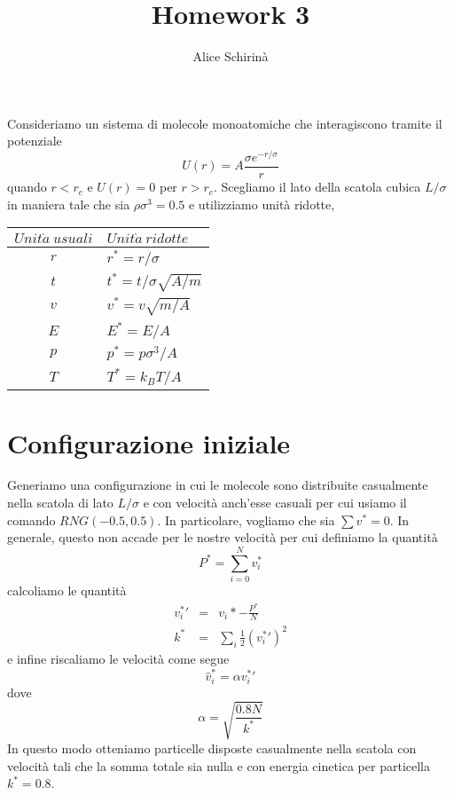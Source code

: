 \documentclass[a4paper,11pt]{article}
\begin{document}
\title{\sc Homework 3}
\author{\sc Alice Schirinà}
\maketitle

Consideriamo un sistema di molecole monoatomiche che interagiscono tramite il potenziale 
\begin{equation*}
U(r) = A \frac{\sigma e^{-r/\sigma}}{r}
\end{equation*}
quando $ r <r_c $ e $U(r) = 0$ per $ r >r_c $. Scegliamo il lato della scatola cubica $ L/\sigma $ in maniera tale che sia $\rho \sigma^3=0.5$ e utilizziamo unità ridotte,
\begin{table}[H]
	\centering
	\begin{tabular}{cl} 
		\hline
		$Unit\grave{a}\ usuali$ & $Unit\grave{a}\ ridotte$ \\
		\hline
		$r$	&	$r^* = r/\sigma$	\\
		$t$	&	$t^* = t/\sigma \sqrt{A/m}$	\\
		$v$	&	$v^* = v\sqrt{m/A}$	\\
		$E$	&	$E^* = E/A$	\\
		$p$	&	$p^* = p \sigma^3/A$	\\
		$T$	&	$T^* = k_B T/A$	\\\hline
	\end{tabular}
\end{table}
\medskip
\noindent \section*{Configurazione iniziale}
Generiamo una configurazione in cui le molecole sono distribuite casualmente nella scatola di lato $ L/\sigma $ e con velocità anch'esse casuali per cui usiamo il comando $RNG(-0.5,0.5)$. In particolare, vogliamo che sia $\sum v^* = 0$. In generale, questo non accade per le nostre velocità per cui definiamo la quantità
\begin{equation*}
P^* = \sum_{i=0}^N v_i^*
\end{equation*}
calcoliamo le quantità
\begin{eqnarray*}
v_i^*' &=& v_i* - \frac{P^*}{N}\\
k^* &=& \sum_i \frac{1}{2} (v_i^*')^2
\end{eqnarray*}
e infine riscaliamo le velocità come segue
\begin{equation*}
\hat{v}_i^* = \alpha v_i^*'
\end{equation*}
dove 
\begin{equation*}
\alpha = \sqrt{\frac{0.8N}{k^*}}
\end{equation*}
In questo modo otteniamo particelle disposte casualmente nella scatola con velocità tali che la somma totale sia nulla e con energia cinetica per particella $k^*=0.8$.
\end{document}
